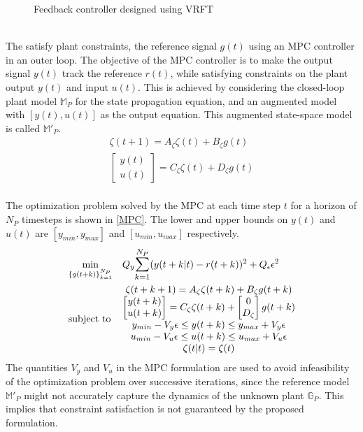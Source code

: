 \documentclass[letterpaper, 10 pt, conference]{ieeeconf}  %
\begin{document}
\begin{enumerate}
\begin{figure}[h]
	\caption{Feedback controller designed using VRFT}
	\end{figure}
	\\
	The satisfy plant constraints, the reference signal $g(t)$ using an MPC controller in an outer loop. The objective of the MPC controller is to make the output signal $y(t)$ track the reference $r(t)$, while satisfying constraints on the plant output $y(t)$ and input $u(t)$. This is achieved by considering the closed-loop plant model $\mathbb{M}_P$ for the state propagation equation, and an augmented model with $[y(t),u(t)]$ as the output equation. This augmented state-space model is called $\mathbb{M}'_P$.
	\begin{equation*}
	\begin{matrix}
	\zeta(t+1) = A_\zeta\zeta(t) + B_\zeta g(t)\\
	\begin{bmatrix}y(t)\\u(t)\end{bmatrix} = C_\zeta\zeta(t) + D_\zeta g(t)
	\end{matrix}
	\end{equation*}
	\\
	The optimization problem solved by the MPC at each time step $t$ for a horizon of $N_P$ timesteps is shown in \eqref{MPC}. The lower and upper bounds on $y(t)$ and $u(t)$ are $[y_{min},y_{max}]$ and $[u_{min},u_{max}]$ respectively.
	\begin{equation}
	\begin{aligned}
	& \underset{\{g(t+k)\}_{k=1}^{N_P}}{\text{min}}
	& & Q_y\mathlarger{\sum\limits_{k=1}^{N_P}}(y(t+k|t)-r(t+k))^2 + Q_{\epsilon}\epsilon^2 \\
	& \text{subject to}
	& & 
	\begin{matrix}
	\zeta(t+k+1) = A_\zeta\zeta(t+k) + B_\zeta g(t+k)\\
	\begin{bmatrix}y(t+k)\\u(t+k)\end{bmatrix} = C_\zeta\zeta(t+k) + \begin{bmatrix}0\\D_\zeta\end{bmatrix}g(t+k)\\
	y_{min}-V_y\epsilon \leq y(t+k) \leq y_{max}+V_y\epsilon \\
	u_{min}-V_u\epsilon \leq u(t+k) \leq u_{max}+V_u\epsilon \\
	\zeta(t|t) = \zeta(t)
	\end{matrix}
	\end{aligned}
	\label{MPC}
	\end{equation}
	The quantities $V_y$ and $V_u$ in the MPC formulation are used to avoid infeasibility of the optimization problem over successive iterations, since the reference model $\mathbb{M}'_P$ might not accurately capture the dynamics of the unknown plant $\mathbb{G}_P$. This implies that constraint satisfaction is not guaranteed by the proposed formulation. 
	

\end{enumerate}
\end{document}

